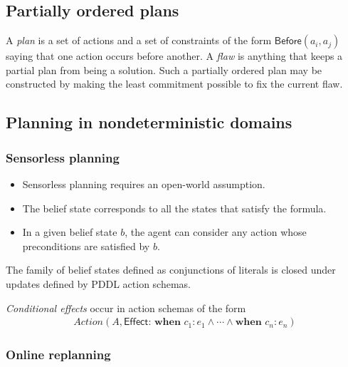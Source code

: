 \documentclass{article}
\begin{document}
\subsection{Partially ordered plans}

\begin{definition}
    A \emph{plan} is a set of actions and a set of constraints of the form $\textsf{Before}(a_i, a_j)$ saying
    that one action occurs before another. A \emph{flaw} is anything that keeps a partial plan from
    being a solution.
    Such a partially ordered plan may be constructed by making the least commitment possible to fix the
    current flaw.
\end{definition}

\subsection{Planning in nondeterministic domains}

\subsubsection{Sensorless planning}

\begin{itemize}
    \item Sensorless planning requires an open-world assumption.
    \item The belief state corresponds to all the states that satisfy the formula.
    \item In a given belief state $b$, the agent can consider any action whose preconditions are satisfied by $b$.
\end{itemize}

\begin{theorem}[R\&N p. 418]
    The family of belief states defined as conjunctions of literals is closed under updates defined by PDDL
    action schemas.
\end{theorem}

\begin{definition}
    \emph{Conditional effects} occur in action schemas of the form
    \begin{align*}
        Action(A,
        \textsf{Effect:}\textbf{ when }c_1: e_1 \wedge \cdots \wedge \textbf{when }c_n: e_n)
    \end{align*}
\end{definition}

\subsubsection{Online replanning}
\end{document}
